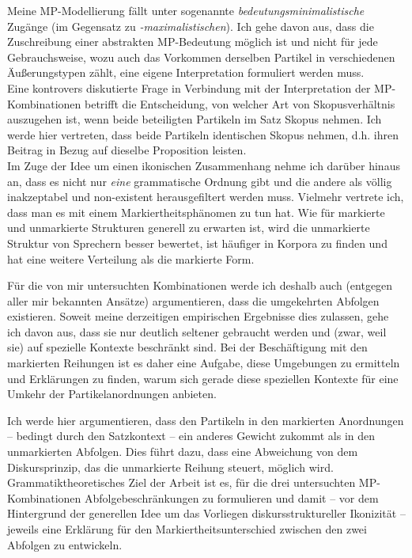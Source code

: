 Meine MP-Modellierung fällt unter sogenannte \textit{bedeutungsminimalistische} Zu\-gänge (im Gegensatz  zu \textit{-maximalistischen}). Ich gehe davon aus, dass die Zuschreibung einer abstrakten MP-Bedeutung möglich ist und nicht für jede Gebrauchsweise, wozu auch das Vorkommen derselben Partikel in verschiedenen Äuße\-rungstypen zählt, eine eigene Interpretation formuliert werden muss. \\

\noindent
Eine kontrovers diskutierte Frage in Verbindung mit der Interpretation der MP-Kombi\-nationen betrifft die Entscheidung, von welcher Art von Skopusverhältnis auszugehen ist, wenn beide beteiligten Partikeln im Satz Skopus nehmen. Ich werde hier vertreten, dass beide Partikeln identischen Skopus nehmen, d.h. ihren Beitrag in Bezug auf dieselbe Proposition leisten. \\

\noindent
Im Zuge der Idee um einen ikonischen Zusammenhang nehme ich darüber hi\-naus an, dass es nicht nur \emph{eine} grammatische Ordnung gibt und die andere als völlig inakzeptabel und non-existent herausgefiltert werden muss. Vielmehr vertrete ich, dass man es mit einem Markiertheitsphänomen zu tun hat. Wie für markierte und unmarkierte Strukturen generell zu erwarten ist, wird die unmarkierte Struktur von Sprechern besser bewertet, ist häufiger in Korpora zu finden und hat eine weitere Verteilung als die markierte Form. 

Für die von mir untersuchten Kombinationen werde ich deshalb auch (entgegen aller mir bekannten Ansätze) argumentieren, dass die umgekehrten Abfolgen existieren. Soweit meine derzeitigen empirischen Ergebnisse dies zulassen, gehe ich davon aus, dass sie nur deutlich seltener gebraucht werden und (zwar, weil sie) auf spezielle Kontexte beschränkt sind. Bei der Beschäftigung mit den markierten Reihungen ist es daher eine Aufgabe, diese Umgebungen zu ermitteln und Erklärungen zu finden, warum sich gerade diese speziellen Kontexte für eine Umkehr der Partikelanordnungen anbieten.\pagebreak\largerpage[-1]

Ich werde hier argumentieren, dass den Partikeln in den markierten Anordnungen – bedingt durch den Satzkontext – ein anderes Gewicht zukommt als in den unmarkierten Abfolgen. Dies führt dazu, dass eine Abweichung von dem Diskursprinzip, das die unmarkierte Reihung steuert, möglich wird.\\

\noindent
Grammatiktheoretisches Ziel der Arbeit ist es, für die drei untersuchten MP-Kom\-bi\-na\-ti\-on\-en Abfolgebeschränkungen zu formulieren und damit – vor dem Hintergrund der generellen Idee um das Vorliegen diskursstruktureller Ikoni\-zität – jeweils eine Erklärung für den Markiertheitsunterschied zwischen den zwei Abfolgen zu entwickeln. \\

